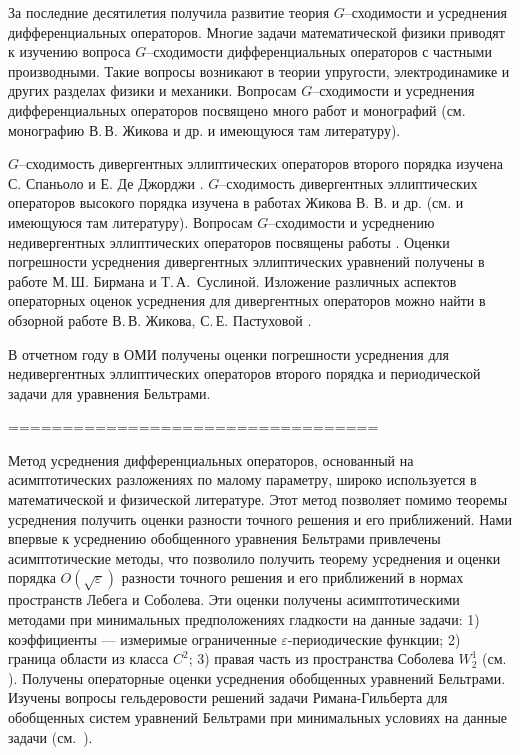 \Introduction




За последние десятилетия получила развитие теория $G$--сходимос\-ти и усреднения дифференциальных
операторов. Многие задачи математической
физики приводят к изучению вопроса $G$--сходимос\-ти дифференциальных
операторов с частными производными. Такие вопросы возникают в теории упругости,
электродинамике и других разделах физики и механики. Вопросам
$G$--сходимости и усреднения дифференциальных
операторов посвящено много работ и монографий (см. монографию В.\,В. Жикова и др.
\cite{smm_ZhKO} и имеющуюся там литературу).

$G$--сходимость дивергентных эллиптических операторов второго порядка изучена
С. Спаньоло и Е. Де Джорджи \cite{smm_Dg1, smm_Dg2, smm_Dg3}. 
$G$--сходимость дивергентных эллиптических операторов высокого порядка изучена в
работах Жикова В. В. и др. (см. \cite{smm_ZhKO} и имеющуюся там литературу).
Вопросам $G$--сходимости и усреднению недивергентных эллиптических операторов
посвящены работы \cite{smm_ZhS, smm_ZhS1, smm_Sir1,smm_Sir}.
Оценки погрешности усреднения  дивергентных эллиптических уравнений  получены в работе  \cite{smm_Sus} М.\,Ш. Бирмана и
  Т.\,А.~Суслиной.
Изложение различных аспектов операторных оценок усреднения для дивергентных
операторов можно найти в обзорной работе В.\,В. Жикова,
С.\,Е. Пастуховой  \cite{smm_VP}.

В отчетном году в ОМИ получены оценки погрешности усреднения для недивергентных
эллиптических операторов второго порядка и периодической задачи для уравнения Бельтрами.


==================================







Метод усреднения дифференциальных операторов, основанный на асимптотических
разложениях по малому параметру, широко используется  в математической и
физической литературе. Этот метод позволяет помимо теоремы усреднения
получить оценки разности точного решения и его приближений. Нами впервые
к усреднению обобщенного уравнения Бельтрами привлечены асимптотические
методы, что позволило получить теорему усреднения и оценки порядка
$O(\sqrt{\varepsilon})$  разности точного решения и его приближений
в нормах пространств Лебега и Соболева. Эти оценки получены
асимптотическими методами при минимальных предположениях гладкости
на данные задачи: 1) коэффициенты --- измеримые ограниченные
$\varepsilon$-периодические функции; 2) граница области из класса $C^2$; 3) правая часть из пространства Соболева $W_2^1$ (см. \cite{1, 2, 4}).
Получены операторные оценки усреднения обобщенных уравнений Бельтрами.
Изучены вопросы гельдеровости решений задачи Римана-Гильберта для
обобщенных систем уравнений Бельтрами при минимальных
условиях на данные задачи (см.\, \cite{3, 5, 6, 7, 8, 9, 10}).

